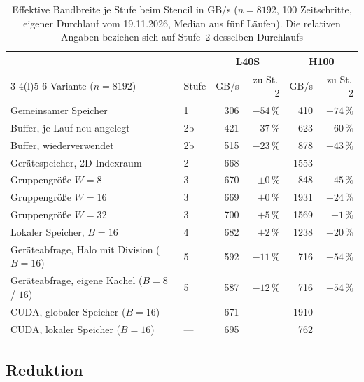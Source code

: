 \documentclass[12pt,a4paper]{article}
\begin{document}
\begin{table}[H]
\centering
\footnotesize
\setlength{\tabcolsep}{4pt}
\caption[Leistung je Stufe beim Stencil (GB/s)]{Effektive Bandbreite je Stufe beim Stencil in GB/s ($n = 8192$, 100 Zeitschritte, eigener Durchlauf vom 19.11.2026, Median aus fünf Läufen). Die relativen Angaben beziehen sich auf Stufe~2 desselben Durchlaufs}
\label{tab:stencil_stufen}
\begin{tabular}{@{}llrrrr@{}}
\toprule
 & & \multicolumn{2}{c}{L40S} & \multicolumn{2}{c}{H100} \\
\cmidrule(lr){3-4}\cmidrule(l){5-6}
Variante ($n = 8192$) & Stufe & GB/s & zu St.\,2 & GB/s & zu St.\,2 \\
\midrule
Gemeinsamer Speicher                     & 1  & 306 & $-54\,\%$ & 410  & $-74\,\%$ \\
Buffer, je Lauf neu angelegt             & 2b & 421 & $-37\,\%$ & 623  & $-60\,\%$ \\
Buffer, wiederverwendet                  & 2b & 515 & $-23\,\%$ & 878  & $-43\,\%$ \\
Gerätespeicher, 2D-Indexraum             & 2  & 668 & --        & 1553 & --        \\
Gruppengröße $W = 8$                     & 3  & 670 & $\pm 0\,\%$ & 848  & $-45\,\%$ \\
Gruppengröße $W = 16$                    & 3  & 669 & $\pm 0\,\%$ & 1931 & $+24\,\%$ \\
Gruppengröße $W = 32$                    & 3  & 700 & $+5\,\%$ & 1569 & $+1\,\%$ \\
Lokaler Speicher, $B = 16$               & 4  & 682 & $+2\,\%$  & 1238 & $-20\,\%$ \\
Geräteabfrage, Halo mit Division ($B = 16$) & 5 & 592 & $-11\,\%$ & 716  & $-54\,\%$ \\
Geräteabfrage, eigene Kachel ($B = 8$ / $16$) & 5 & 587 & $-12\,\%$ & 716  & $-54\,\%$ \\
\midrule
CUDA, globaler Speicher ($B = 16$)       & --- & 671 &           & 1910 &           \\
CUDA, lokaler Speicher ($B = 16$)        & --- & 695 &           & 762  &           \\
\bottomrule
\end{tabular}
\end{table}

\subsection{Reduktion}\label{sec:a-reduktion}
\end{document}
